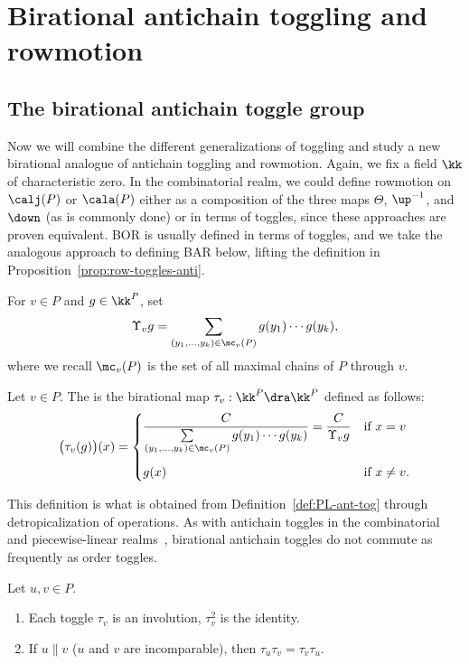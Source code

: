 \section{Birational antichain toggling and rowmotion}\label{sec:batar}
\subsection{The birational antichain toggle group}
Now we will combine the different generalizations of toggling and study a new birational analogue of antichain toggling and rowmotion.
Again, we fix a field $\kk$ of characteristic zero.
In the combinatorial realm, we could define rowmotion on $\calj(P)$ or $\cala(P)$ either as
a composition of the three maps 
$\Theta$, $\up^{-1}$, and $\down$ (as is commonly done)
or in terms of toggles, since these approaches are proven equivalent.
BOR is usually defined in terms of toggles, and we take the analogous approach to defining
BAR below, lifting the definition in 
Proposition~\ref{prop:row-toggles-anti}.

\begin{defi}
For $v\in P$ and $g\in \kk^P$, set
\[
\Upsilon_v g=
\sum\limits_{(y_1,\dots,y_k)\in \mc_v(P)} g(y_1) \cdots g(y_k),
\]
where we recall $\mc_v(P)$ is the set of all maximal chains of $P$ through $v$.
\end{defi}

\begin{defi}
Let $v\in P$. The  is the birational map $\tau_v:\kk^P \dra \kk^P$ defined as follows:
\[
\big(\tau_v(g)\big)(x) = \begin{cases}
\dfrac{C}{\sum\limits_{(y_1,\dots,y_k)\in \mc_v(P)} g(y_1) \cdots g(y_k)} = \dfrac{C}{\Upsilon_v g} &\text{if $x=v$}\\\vspace{-7 pt}\\
g(x) &\text{if $x\not=v$}.
\end{cases}
\]
\end{defi}

This definition is what is obtained from Definition~\ref{def:PL-ant-tog}
through detropicalization of operations.
As with antichain toggles in the combinatorial and piecewise-linear 
realms~\cite{strikergentog,antichain-toggling}, birational antichain toggles do not commute
as frequently as order toggles. 

\begin{prop}\label{prop:basic-tau-prop}
Let $u,v\in P$.
\begin{enumerate}[label=(\alph*)]
\item\label{prop3.3_1} Each toggle $\tau_v$ is an involution, \ie $\tau_v^2$ is the identity.
\item\label{prop3.3_2} If $u\parallel v$ (\ie $u$ and $v$ are incomparable), then $\tau_u \tau_v = \tau_v \tau_u$.
\end{enumerate}
\end{prop}

